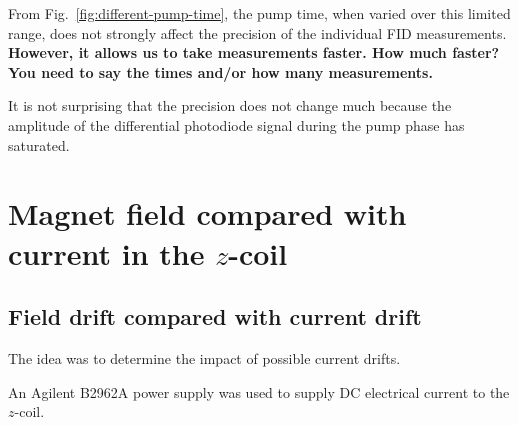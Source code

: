 From Fig.~\ref{fig:different-pump-time}, the pump time, when varied
over this limited range, does not strongly affect the precision of the
individual FID measurements.  {\bf However, it allows us to take
  measurements faster.  How much faster?  You need to say the times
  and/or how many measurements.}
  

It is not surprising that the precision does not change much because
the amplitude of the differential photodiode signal during the pump
phase has saturated.



\section{Magnet field compared with current in the $z$-coil}

\subsection{Field drift compared with current drift}

The idea was to determine the impact of possible current drifts.
  
An Agilent B2962A power supply was used to supply DC electrical
current to the $z$-coil.

